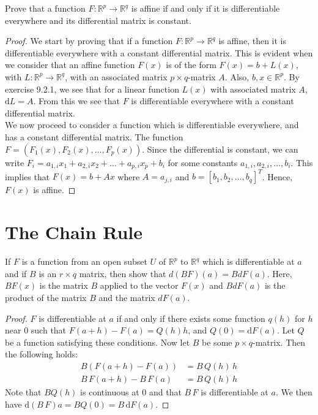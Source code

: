 \documentclass[12pt]{book}
\newcommand{\R}{\mathbb{R}}
\newenvironment{exercise}[2][Exercise]{\begin{trivlist}
\item[\hskip \labelsep {\bfseries #1}\hskip \labelsep {\bfseries #2.}]}{\end{trivlist}}
\begin{document}
\begin{exercise}{9.2.12}
	Prove that a function $F: \R^p \to \R^q$ is affine if and only if it is differentiable everywhere and its differential matrix is constant. 
	
	\begin{proof}
    We start by proving that if a function $F: \R^p \to \R^q$ is affine, then it is differentiable everywhere with a constant differential matrix. This is evident when we consider that an affine function $F(x)$ is of the form $F(x) = b + L(x)$, with $L: \R^p \to \R^q$, with an associated matrix $p \times q$-matrix $A$. Also, $b,x \in \R^p$. By exercise 9.2.1, we see that for a linear function $L(x)$ with associated matrix $A$, $\text{d}L=A$. From this we see that $F$ is differentiable everywhere with a constant differential matrix. \\
    We now proceed to consider a function which is differentiable everywhere, and has a constant differential matrix. The function $F = (F_1(x), F_2(x), \hdots, F_p (x) )$. Since the differential is constant, we can write $F_i= a_{1,i} x_1 + a_{2,i} x_2 + \hdots + a_{p,i} x_p + b_i $ for some constants $a_{1,i}, a_{2,i}, ..., b_i$. This implies that $F(x) = b + A x$ where $A=a_{j,i}$ and $b = [b_1, b_2, \hdots, b_q ]^T$. Hence, $F(x)$ is affine.
	\end{proof}
\end{exercise}



\section{The Chain Rule}


\begin{exercise}{9.3.1}
	If $F$ is a function from an open subset $U$ of $\R^p$ to $\R^q$ which is differentiable at $a$ and if $B$ is an $r \times q$ matrix, then show that $d( BF) (a) = B d F(a)$. Here, $B F(x)$ is the matrix $B$ applied to the vector $F(x)$ and $BdF(a)$ is the product of the matrix $B$ and the matrix $dF(a)$.

	\begin{proof}
    $F$ is differentiable at $a$ if and only if there exists some function $q(h)$ for $h$ near $0$ such that $F(a+h)-F(a)=Q(h) h$, and $Q(0)=\text{d}F(a)$. Let $Q$ be a function satisfying these conditions. Now let $B$ be some $p\times q$-matrix. Then the following holds:
        \begin{align*}
        B \left(F(a+h)-F(a)\right) &= B\, Q(h)\, h  \\
          B \, F(a+h) - B \, F(a)  &= B\, Q(h)\, h
        \end{align*}
    Note that $B Q(h)$ is continuous at 0 and that $B \, F$ is differentiable at $a$. We then have $\text{d}(B\,F)a = B Q(0) = B\, \text{d} F(a)$.
	\end{proof}
\end{exercise}
\end{document}
